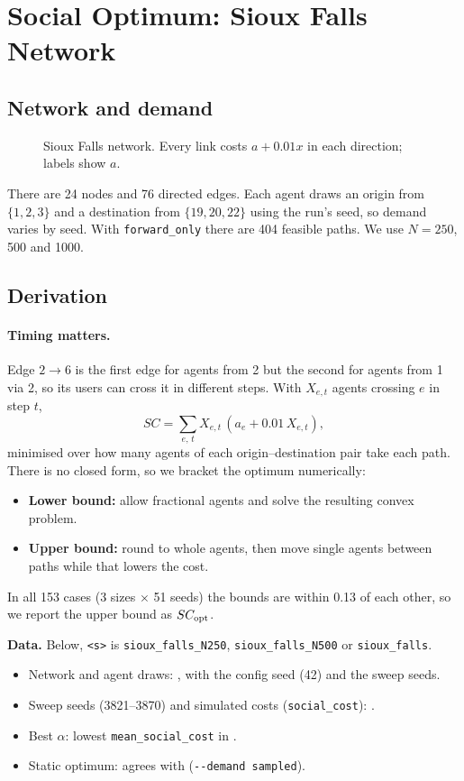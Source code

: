 \documentclass[11pt]{article}
\begin{document}
\section{Social Optimum: Sioux Falls Network}

\subsection{Network and demand}

\begin{figure}[H]
  \centering
  
  \caption{Sioux Falls network. Every link costs $a + 0.01x$ in each direction; labels show $a$.}
\end{figure}

There are 24 nodes and 76 directed edges. Each agent draws an origin from $\{1, 2, 3\}$ and a destination
from $\{19, 20, 22\}$ using the run's seed, so demand varies by seed. With \texttt{forward\_only} there are
404 feasible paths. We use $N = 250$, 500 and 1000.

\subsection{Derivation}

\paragraph{Timing matters.} Edge $2 \to 6$ is the first edge for agents from 2 but the second for agents
from 1 via 2, so its users can cross it in different steps. With $X_{e,t}$ agents crossing $e$ in step
$t$,
\[
  SC = \sum_{e,\,t} X_{e,t}\,(a_e + 0.01\,X_{e,t}),
\]
minimised over how many agents of each origin--destination pair take each path. There is no closed form,
so we bracket the optimum numerically:
\begin{itemize}
  \item \textbf{Lower bound:} allow fractional agents and solve the resulting convex problem.
  \item \textbf{Upper bound:} round to whole agents, then move single agents between paths while that
        lowers the cost.
\end{itemize}
In all 153 cases (3 sizes $\times$ 51 seeds) the bounds are within 0.13 of each other, so we report the
upper bound as $SC_{\mathrm{opt}}$.

\textbf{Data.} Below, \texttt{<s>} is \texttt{sioux\_falls\_N250}, \texttt{sioux\_falls\_N500} or
\texttt{sioux\_falls}.
\begin{itemize}
  \item Network and agent draws: , with the config seed (42) and the sweep seeds.
  \item Sweep seeds (3821--3870) and simulated costs (\texttt{social\_cost}):
        .
  \item Best $\alpha$: lowest \texttt{mean\_social\_cost} in .
  \item Static optimum: agrees with  (\texttt{-{}-demand sampled}).
\end{itemize}
\end{document}
